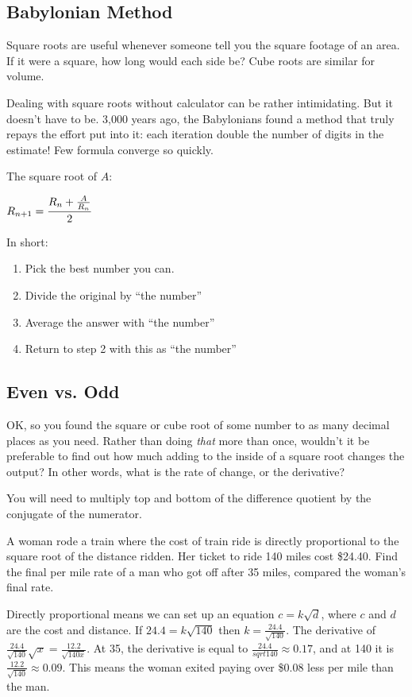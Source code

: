 
\subsection{Babylonian Method}


Square roots are useful whenever someone tell you the square footage of an area.  If it 
were a square, how long would each side be?  Cube roots are similar for volume. 

Dealing with square roots without calculator can be rather intimidating.  But it doesn't have
to be.  3,000 years ago, the Babylonians found a method that truly repays the effort put into it:
each iteration double the number of digits in the estimate!  Few formula converge so quickly.

The square root of $A$:

$R_{n+1}=\cfrac{R_n + \frac{A}{R_n}}{2}$

In short:
\begin{enumerate}
\item Pick the best number you can.
\item Divide the original by ``the number''
\item Average the answer with ``the number''
\item Return to step 2 with this as ``the number''
\end{enumerate}


\subsection{Even vs. Odd}
OK, so you found the square or cube root of some number to as many decimal places as
you need.  Rather than doing \emph{that} more than once, wouldn't it be preferable to find
out how much adding to the inside of a square root changes the output?  In other words,
what is the rate of change, or the derivative?

You will need to multiply top and bottom of the difference quotient by the conjugate of the
numerator.


\begin{example}
\exProblem
A woman rode a train where the cost of train ride is directly proportional to the square 
root of the distance ridden.  Her ticket to ride 140 miles cost \$24.40.  
Find the final per mile rate of a man who got off after 35 miles, 
compared the woman's final rate.

\exSolution
Directly proportional means we can set up an equation $c = k \sqrt{d}$, where $c$ and $d$
are the cost and distance.  If $24.4 = k\sqrt{140}$ then $k=\frac{24.4}{\sqrt{140}}$.  The
derivative of $\frac{24.4}{\sqrt{140}}\sqrt{x} = \frac{12.2}{\sqrt{140x}}$.  At 35, the
derivative is equal to $\frac{24.4}{sqrt{140}} \approx 0.17$, and at 140 it is 
$\frac{12.2}{\sqrt{140}} \approx 0.09$.  This means the woman exited paying over
\$0.08 less per mile than the man.
\end{example}

~\vfill

